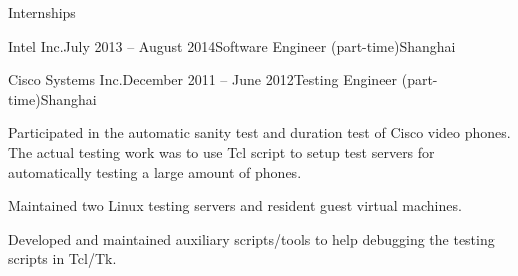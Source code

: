 \documentclass{resume} %
\begin{document}
\begin{rSection}{Internships}
\begin{rSubsection}{Intel Inc.}{July 2013 -- August 2014}{Software Engineer (part-time)}{Shanghai}
    \end{rSubsection}

    \begin{rSubsection}{Cisco Systems Inc.}{December 2011 -- June 2012}{Testing Engineer (part-time)}{Shanghai}

    \item Participated in the automatic sanity test and duration test of Cisco
        video phones. The actual testing work was to use Tcl script to
        setup test servers for automatically testing a large amount of phones.

    \item Maintained two Linux testing servers and resident guest virtual
        machines.

    \item Developed and maintained auxiliary scripts/tools to help debugging
        the testing scripts in Tcl/Tk.

    \end{rSubsection}

\end{rSection}
\end{document}
